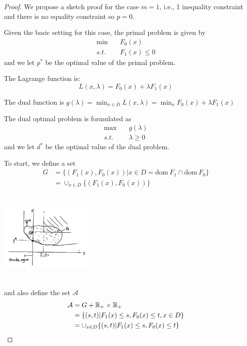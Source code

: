 \begin{proof}

We propose a sketch proof for the case $m = 1$, i.e., 1 inequality constraint and there is no equality constraint so $p = 0$.

Given the basic setting for this case, the primal problem is given by
\begin{align*}
	\min \quad & F_0(x)\\
	s.t. \quad & F_1(x) \leq 0
\end{align*}
and we let $p^*$ be the optimal value of the primal problem.

The Lagrange function is:
$$L(x, \lambda) = F_0(x) + \lambda F_1(x)$$

The dual function is
$g(\lambda) = \min_{x\in D} L(x,\lambda) = \min_x{F_0(x) + \lambda F_1(x)}$

The dual optimal problem is formulated as
\begin{align*}
	\max \quad & g(\lambda)\\
	s.t. \quad & \lambda  \geq 0
\end{align*}
and we let $d^*$ be the optimal value of the dual problem.

To start, we define a set
\begin{align*}
	G 
	&= \{(F_1(x), F_0(x)) \vert x\in D = \text{dom}\ F_1\cap \text{dom}\ F_0 \}\\
	&= \cup_{x\in D}\{(F_1(x), F_0(x)) \}
\end{align*}

\begin{marginfigure}
	\centering
	\includegraphics[width=1.8in,height=1.8in]{figures/ch10/figure1125_2.png}
\end{marginfigure}

and also define the set $\mathcal{A}$
\begin{align*}
	\mathcal{A} 
	&= G + \mathbb{R}_+ \times \mathbb{R}_+\\
	&= \{(s,t) \vert F_1(x)\leq s, F_0(x)\leq t, x\in D \}\\
	&= \cup_{x\in D}\{(s,t)\vert F_1(x)\leq s, F_0(x)\leq t \}
\end{align*}


\end{proof}
